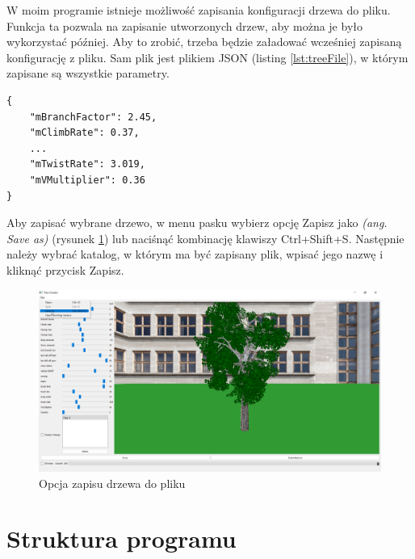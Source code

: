 \documentclass[a4paper,twoside,12pt]{report}
\begin{document}
W moim programie istnieje możliwość zapisania konfiguracji drzewa do pliku. 
Funkcja ta pozwala na zapisanie utworzonych drzew, aby można je było 
wykorzystać później. Aby to zrobić, trzeba będzie 
załadować wcześniej zapisaną konfigurację z pliku.
Sam plik jest plikiem JSON (listing \ref{lst:treeFile}), w którym zapisane są wszystkie parametry.

\begin{lstlisting}[caption={Zawartość pliku drzewa}, label={lst:treeFile}]
{
    "mBranchFactor": 2.45,
    "mClimbRate": 0.37,
	...
    "mTwistRate": 3.019,
    "mVMultiplier": 0.36
}
\end{lstlisting}

Aby zapisać wybrane drzewo, w menu pasku wybierz opcję Zapisz 
jako \textit{(ang. Save as)} (rysunek \ref{fig:saveTree}) lub naciśnąć kombinację klawiszy Ctrl+Shift+S. 
Następnie należy wybrać katalog, w którym ma być zapisany plik, 
wpisać jego nazwę i kliknąć przycisk Zapisz.

\begin{figure}[H]
	\centering\includegraphics[width=15.5cm]{grafika/program/saveTree.png}
	\caption{Opcja zapisu drzewa do pliku}
    \label{fig:saveTree}
\end{figure}


\section{Struktura programu}
\end{document}
